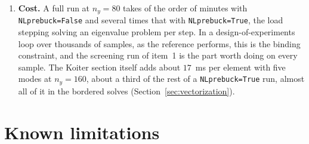 \documentclass[11pt,a4paper]{article}
\begin{document}
\begin{enumerate}
        \texttt{WARNING} about stopping short of
        $1 - \texttt{NLprebuck\_eps1}$ as a failure rather than a note: the
        expansion is then made about a state that is not in the neighbourhood
        of the bifurcation point, which is the very thing
        Section~\ref{sec:step} is for.
  \item \textbf{Cost.}  A full run at $n_y = 80$ takes of the order of
        minutes with \texttt{NLprebuck=False} and several times that with
        \texttt{NLprebuck=True}, the load stepping solving an eigenvalue
        problem per step.  In a design-of-experiments loop over thousands of
        samples, as the reference performs, this is the binding constraint,
        and the screening run of item~1 is the part worth doing on every
        sample.  The Koiter section itself adds about $17$~ms per element with
        five modes at $n_y = 160$, about a third of the rest of a
        \texttt{NLprebuck=True} run, almost all of it in the bordered solves
        (Section~\ref{sec:vectorization}).
\end{enumerate}

\section{Known limitations}
\label{sec:limits}
\end{document}
